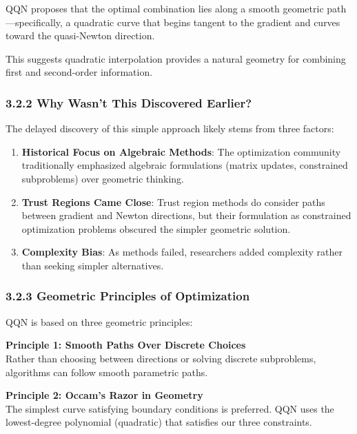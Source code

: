 QQN proposes that the optimal combination lies along a smooth geometric path---specifically, a quadratic curve that begins tangent to the gradient and curves toward the quasi-Newton direction.

This suggests quadratic interpolation provides a natural geometry for combining first and second-order information.

\hypertarget{why-wasnt-this-discovered-earlier}{%
\subsubsection{3.2.2 Why Wasn't This Discovered Earlier?}\label{why-wasnt-this-discovered-earlier}}

The delayed discovery of this simple approach likely stems from three factors:

\begin{enumerate}
\def\labelenumi{\arabic{enumi}.}
\item
  \textbf{Historical Focus on Algebraic Methods}: The optimization community traditionally emphasized algebraic formulations (matrix updates, constrained subproblems) over geometric thinking.
\item
  \textbf{Trust Regions Came Close}: Trust region methods do consider paths between gradient and Newton directions, but their formulation as constrained optimization problems obscured the simpler geometric solution.
\item
  \textbf{Complexity Bias}: As methods failed, researchers added complexity rather than seeking simpler alternatives.
\end{enumerate}

\hypertarget{geometric-principles-of-optimization}{%
\subsubsection{3.2.3 Geometric Principles of Optimization}\label{geometric-principles-of-optimization}}

QQN is based on three geometric principles:

\textbf{Principle 1: Smooth Paths Over Discrete Choices}\\
Rather than choosing between directions or solving discrete subproblems, algorithms can follow smooth parametric paths.

\textbf{Principle 2: Occam's Razor in Geometry}\\
The simplest curve satisfying boundary conditions is preferred. QQN uses the lowest-degree polynomial (quadratic) that satisfies our three constraints.

